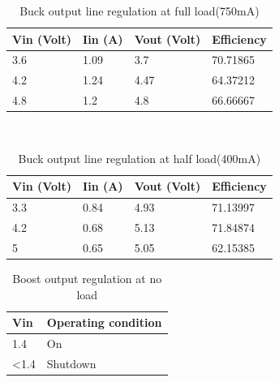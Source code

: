 \begin{table}[H]
\centering
\begin{tabular}{|l|l|l|l|}
\hline
Vin (Volt) & Iin (A) & Vout (Volt) & Efficiency \\ \hline
3.6        & 1.09    & 3.7         & 70.71865   \\ \hline
4.2        & 1.24    & 4.47        & 64.37212   \\ \hline
4.8        & 1.2     & 4.8         & 66.66667   \\ \hline
\end{tabular}
\caption{Buck output line regulation at full load(750mA)}
\label{table:4}
\end{table}
\\
\begin{table}[H]
\centering
\begin{tabular}{|l|l|l|l|}
\hline
Vin (Volt) & Iin (A) & Vout (Volt) & Efficiency \\ \hline
3.3        & 0.84    & 4.93        & 71.13997   \\ \hline
4.2        & 0.68    & 5.13        & 71.84874   \\ \hline
5          & 0.65    & 5.05        & 62.15385   \\ \hline
\end{tabular}
\caption{Buck output line regulation at half load(400mA)}
\label{table:4}
\end{table}

\begin{table}[h]
\centering
\begin{tabular}{|l|l|}
\hline
Vin            & Operating condition \\ \hline
1.4            & On                  \\ \hline
\textless{}1.4 & Shutdown            \\ \hline
\end{tabular}
\caption{Boost output regulation at no load}
\label{table:4}
\end{table}
